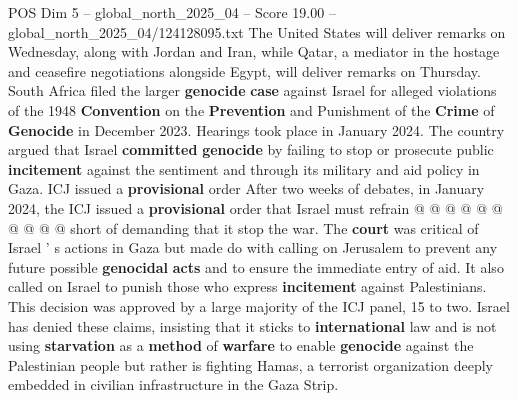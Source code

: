 \begin{textsample}{POS Dim 5 – global\_north\_2025\_04 – Score 19.00 – global\_north\_2025\_04/124128095.txt}
The United States will deliver remarks on Wednesday, along with Jordan and Iran, while Qatar, a mediator in the hostage and ceasefire negotiations alongside Egypt, will deliver remarks on Thursday.
South Africa filed the larger \textbf{genocide} \textbf{case} against Israel for alleged violations of the 1948 \textbf{Convention} on the \textbf{Prevention} and Punishment of the \textbf{Crime} of \textbf{Genocide} in December 2023.
Hearings took place in January 2024.
The country argued that Israel \textbf{committed} \textbf{genocide} by failing to stop or prosecute public \textbf{incitement} against the sentiment and through its military and aid policy in Gaza.
ICJ issued a \textbf{provisional} order After two weeks of debates, in January 2024, the ICJ issued a \textbf{provisional} order that Israel must refrain @ @ @ @ @ @ @ @ @ @ short of demanding that it stop the war.
The \textbf{court} was critical of Israel ' s actions in Gaza but made do with calling on Jerusalem to prevent any future possible \textbf{genocidal} \textbf{acts} and to ensure the immediate entry of aid.
It also called on Israel to punish those who express \textbf{incitement} against Palestinians.
This decision was approved by a large majority of the ICJ panel, 15 to two.
Israel has denied these claims, insisting that it sticks to \textbf{international} law and is not using \textbf{starvation} as a \textbf{method} of \textbf{warfare} to enable \textbf{genocide} against the Palestinian people but rather is fighting Hamas, a terrorist organization deeply embedded in civilian infrastructure in the Gaza Strip.

\end{textsample}

